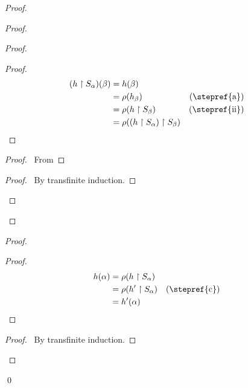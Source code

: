 \begin{proof}
\begin{proof}
\begin{proof}
\begin{proof}
\begin{align*}
                    (h \restriction S_\alpha)(\beta) & = h(\beta) \\
                    & = \rho(h_\beta) & (\text{\stepref{a}}) \\
                    & = \rho(h \restriction S_\beta) & (\text{\stepref{ii}}) \\
                    & = \rho((h \restriction S_\alpha) \restriction S_\beta)
                \end{align*}
            \end{proof}
            \begin{proof}
                \pf\ From 
            \end{proof}
            \qedstep
            \begin{proof}
                \pf\ By transfinite induction.
            \end{proof}
        \end{proof}
    \end{proof}
    \begin{proof}
        \begin{proof}
            \pf
            \begin{align*}
                h(\alpha) & = \rho(h \restriction S_\alpha) \\
                & = \rho(h' \restriction S_\alpha) & (\text{\stepref{c}}) \\
                & = h'(\alpha)
            \end{align*}
        \end{proof}
        \qedstep
        \begin{proof}
            \pf\ By transfinite induction.
        \end{proof}
    \end{proof}
    \qed
\end{proof}

